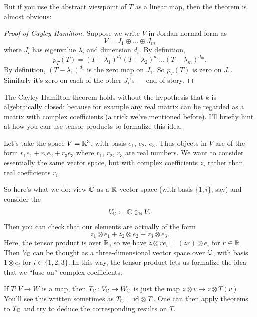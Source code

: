 But if you use the abstract viewpoint of $T$ as a linear map,
then the theorem is almost obvious:
\begin{proof}[Proof of Cayley-Hamilton]
	Suppose we write $V$ in Jordan normal form as
	\[ V = J_1 \oplus \dots \oplus J_m \]
	where $J_i$ has eigenvalue $\lambda_i$ and dimension $d_i$.
	By definition,
	\[ p_T(T) = (T - \lambda_1)^{d_1} (T - \lambda_2)^{d_2}
		\dots (T - \lambda_m)^{d_m}. \]
	By definition, $(T - \lambda_1)^{d_1}$ is the zero map on $J_1$.
	So $p_T(T)$ is zero on $J_1$.
	Similarly it's zero on each of the other $J_i$'s --- end of story.
\end{proof}
\begin{remark}
	[Tensoring up]
	The Cayley-Hamilton theorem holds without the hypothesis that
	$k$ is algebraically closed:
	because for example any real matrix can be regarded
	as a matrix with complex coefficients
	(a trick we've mentioned before).
	I'll briefly hint at how you can use tensor products to formalize this idea.

	Let's take the space $V = \mathbb R^3$, with basis $e_1$, $e_2$, $e_3$.
	Thus objects in $V$ are of the form $r_1 e_1 + r_2 e_2 + r_3 e_3$
	where $r_1$, $r_2$, $r_3$ are real numbers.
	We want to consider essentially the same vector space,
	but with complex coefficients $z_i$ rather than real coefficients $r_i$.

	So here's what we do: view $\mathbb C$ as a $\mathbb R$-vector space
	(with basis $\{1,i\}$, say)
	and consider the 
	\[ V_\mathbb C \coloneqq \mathbb C \otimes_\mathbb R V. \]
	Then you can check that our elements are actually of the form
	\[ z_1 \otimes e_1 + z_2 \otimes e_2 + z_3 \otimes e_3. \]
	Here, the tensor product is over $\mathbb R$,
	so we have $z \otimes re_i = (zr) \otimes e_i$ for $r \in \mathbb R$.
	Then $V_{\mathbb C}$ can be thought as a three-dimensional vector space over $\mathbb C$,
	with basis $1 \otimes e_i$ for $i \in \{1,2,3\}$.
	In this way, the tensor product lets us formalize the idea
	that we ``fuse on'' complex coefficients.

	If $T \colon V \to W$ is a map, then $T_\mathbb C \colon V_\mathbb C \to W_\mathbb C$
	is just the map $z \otimes v \mapsto z \otimes T(v)$.
	You'll see this written sometimes as $T_\mathbb C = \mathrm{id} \otimes T$.
	One can then apply theorems to $T_\mathbb C$
	and try to deduce the corresponding results on $T$.
\end{remark}

